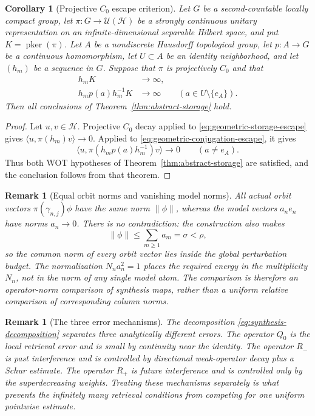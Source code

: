 \documentclass[10pt,a4paper]{amsart}
\numberwithin{equation}{section}
\newtheorem{corollary}[theorem]{Corollary}
\newtheorem{remark}[theorem]{Remark}
\newcommand{\cH}{\mathcal H}
\newcommand{\U}{\mathcal U}
\newcommand{\pker}{\operatorname{pker}}
\begin{document}
\begin{corollary}[Projective $C_0$ escape criterion]
\label{cor:projective-storage}
Let $G$ be a second-countable locally compact group, let
$\pi:G\to\U(\cH)$ be a strongly continuous unitary representation on an
infinite-dimensional separable Hilbert space, and put $K=\pker(\pi)$.
Let $A$ be a nondiscrete Hausdorff topological group, let
$p:A\to G$ be a continuous homomorphism, let $U\subset A$ be an identity
neighborhood, and let $(h_m)$ be a sequence in $G$.  Suppose that $\pi$ is
projectively $C_0$ and that
\begin{align}
 h_mK&\longrightarrow\infty,                                      \label{eq:geometric-storage-escape}\\
 h_mp(a)h_m^{-1}K&\longrightarrow\infty
 \qquad(a\in U\setminus\{e_A\}).                                \label{eq:geometric-conjugation-escape}
\end{align}
Then all conclusions of Theorem~\ref{thm:abstract-storage} hold.
\end{corollary}

\begin{proof}
Let $u,v\in\cH$.  Projective $C_0$ decay applied to
\eqref{eq:geometric-storage-escape} gives
$\langle u,\pi(h_m)v\rangle\to0$.  Applied to
\eqref{eq:geometric-conjugation-escape}, it gives
\[
 \langle u,\pi(h_mp(a)h_m^{-1})v\rangle\longrightarrow0
 \qquad(a\neq e_A).
\]
Thus both WOT hypotheses of Theorem~\ref{thm:abstract-storage} are satisfied,
and the conclusion follows from that theorem.
\end{proof}

\begin{remark}[Equal orbit norms and vanishing model norms]
\label{rem:equal-norm-objection}
All actual orbit vectors $\pi(\gamma_{n,j})\phi$ have the same norm
$\|\phi\|$, whereas the model vectors $a_ne_n$ have norms $a_n\to0$.
There is no contradiction: the construction also makes
\[
 \|\phi\|\leq\sum_{m\geq1}a_m=\sigma<\rho,
\]
so the common norm of every orbit vector lies inside the global perturbation
budget.  The normalization $N_na_n^2=1$ places the required energy in the
multiplicity $N_n$, not in the norm of any single model atom.  The comparison
is therefore an operator-norm comparison of synthesis maps, rather than a
uniform relative comparison of corresponding column norms.
\end{remark}

\begin{remark}[The three error mechanisms]\label{rem:three-errors}
The decomposition \eqref{eq:synthesis-decomposition} separates three
analytically different errors.  The operator $Q_0$ is the local retrieval
error and is small by continuity near the identity.  The operator $R_-$ is
past interference and is controlled by directional weak-operator decay plus
a Schur estimate.  The operator $R_+$ is future interference and is controlled
only by the superdecreasing weights.  Treating these mechanisms separately
is what prevents the infinitely many retrieval conditions from competing for
one uniform pointwise estimate.
\end{remark}
\end{document}
